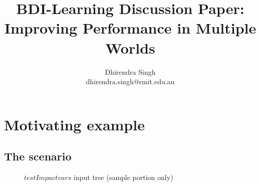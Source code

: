 \documentclass[a4paper]{article}
\title{BDI-Learning Discussion Paper:\\Improving Performance in Multiple Worlds}
\author{
Dhirendra Singh\\ 
dhirendra.singh@rmit.edu.au\\
}
\begin{document}

\maketitle

\setcounter{tocdepth}{2} 
\tableofcontents 
\newpage

\section{Motivating example}

\subsection{The scenario}
\begin{figure}[htbp]
   \centering
{}
   \caption{$testImpactvars$ input tree (sample portion only)}
   \label{fig:testImpactvarsTree}
\end{figure}
\end{document}
